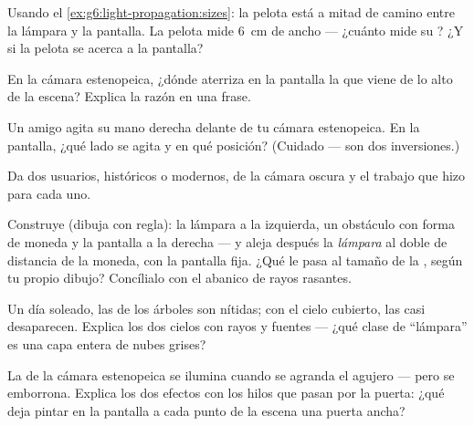 \begin{exercise}[$\star$]\label{exo:g6:light-propagation:5}
Usando el \cref{ex:g6:light-propagation:sizes}: la pelota está a mitad
de camino entre la lámpara y la pantalla. La pelota mide \qty{6}{cm}
de ancho --- ¿cuánto mide su ? ¿Y si la pelota se acerca a la
pantalla?
\end{exercise}

\begin{exercise}[$\star$]\label{exo:g6:light-propagation:6}
En la cámara estenopeica, ¿dónde aterriza en la pantalla la  que
viene de lo alto de la escena? Explica la razón en una frase.
\end{exercise}

\begin{exercise}[$\star$]\label{exo:g6:light-propagation:7}
Un amigo agita su mano derecha delante de tu cámara estenopeica. En la
pantalla, ¿qué lado se agita y en qué posición? (Cuidado --- son dos
inversiones.)
\end{exercise}

\begin{exercise}[$\star$]\label{exo:g6:light-propagation:8}
Da dos usuarios, históricos o modernos, de la cámara oscura y el
trabajo que hizo para cada uno.
\end{exercise}

\begin{exercise}[$\star\star$]\label{exo:g6:light-propagation:9}
Construye (dibuja con regla): la lámpara a la izquierda, un obstáculo
con forma de moneda y la pantalla a la derecha --- y aleja después la
\emph{lámpara} al doble de distancia de la moneda, con la pantalla
fija. ¿Qué le pasa al tamaño de la , según tu propio dibujo?
Concílialo con el abanico de rayos rasantes.
\end{exercise}

\begin{exercise}[$\star\star$]\label{exo:g6:light-propagation:10}
Un día soleado, las  de los árboles son nítidas; con el cielo
cubierto, las  casi desaparecen. Explica los dos cielos con
rayos y fuentes --- ¿qué clase de ``lámpara'' es una capa entera de
nubes grises?
\end{exercise}

\begin{exercise}[$\star\star$]\label{exo:g6:light-propagation:11}
La  de la cámara estenopeica se ilumina cuando se agranda el
agujero --- pero se emborrona. Explica los dos efectos con los hilos
que pasan por la puerta: ¿qué deja pintar en la pantalla a cada punto
de la escena una puerta ancha?
\end{exercise}

